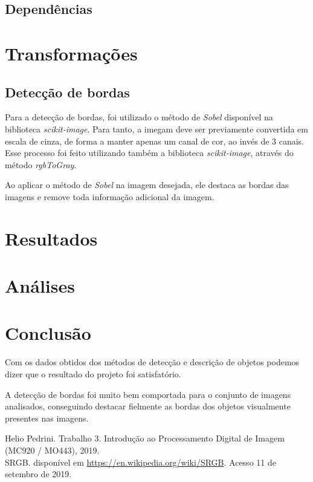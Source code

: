 \documentclass[conference]{IEEEtran}
\begin{document}
    \subsection{Dependências}


\section{Transformações}

    \subsection{Detecção de bordas}

        Para a detecção de bordas, foi utilizado o método de \textit{Sobel} disponível na biblioteca \textit{scikit-image}.
        Para tanto, a imegam deve ser previamente convertida em escala de cinza, de forma a manter apenas um canal de cor, ao invés de 3 canais. Esse processo foi feito utilizando também a biblioteca \textit{scikit-image}, através do método \textit{rgbToGray}.

        Ao aplicar o método de \textit{Sobel} na imagem desejada, ele destaca as bordas das imagens e remove toda informação adicional da imagem.

\section{Resultados}


\section{Análises}


\section{Conclusão}

    Com os dados obtidos dos métodos de detecção e descrição de objetos podemos dizer que o resultado do projeto foi satisfatório.

    A detecção de bordas foi muito bem comportada para o conjunto de imagens analisados, conseguindo destacar fielmente as bordas dos objetos visualmente presentes nas imagens.



\begin{thebibliography}{00}

   Helio Pedrini. Trabalho 3. Introdução ao Processamento Digital de Imagem (MC920 / MO443), 2019.\\

   SRGB. disponível em \url{https://en.wikipedia.org/wiki/SRGB}. Acesso 11 de setembro de 2019.

\end{thebibliography}
\end{document}
